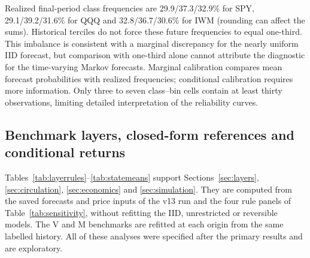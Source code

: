Realized final-period class frequencies are 29.9/37.3/32.9\% for SPY, 29.1/39.2/31.6\% for QQQ and 32.8/36.7/30.6\% for IWM (rounding can affect the sums). Historical terciles do not force these future frequencies to equal one-third. This imbalance is consistent with a marginal discrepancy for the nearly uniform IID forecast, but comparison with one-third alone cannot attribute the diagnostic for the time-varying Markov forecasts. Marginal calibration compares mean forecast probabilities with realized frequencies; conditional calibration requires more information. Only three to seven class--bin cells contain at least thirty observations, limiting detailed interpretation of the reliability curves.







\clearpage
\subsection{Benchmark layers, closed-form references and conditional returns}\label{app:layers}
Tables~\ref{tab:layerrules}--\ref{tab:statemeans} support Sections~\ref{sec:layers}, \ref{sec:circulation}, \ref{sec:economics} and \ref{sec:simulation}. They are computed from the saved forecasts and price inputs of the v13 run and the four rule panels of Table~\ref{tab:sensitivity}, without refitting the IID, unrestricted or reversible models. The V and M benchmarks are refitted at each origin from the same labelled history. All of these analyses were specified after the primary results and are exploratory.









\clearpage

